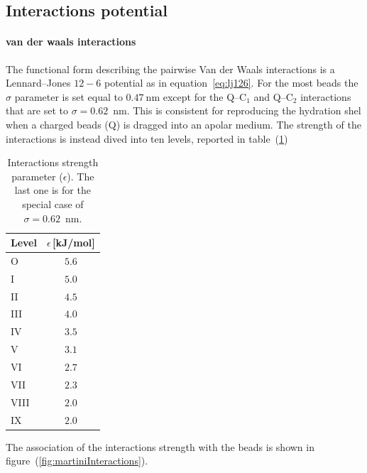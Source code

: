 \subsection{Interactions potential}
\paragraph{\textbf{van der waals interactions}} The functional form describing the pairwise Van der Waals interactions is a Lennard--Jones $12-6$ potential as in equation~\eqref{eq:lj126}.
For the most beads the $\sigma$ parameter is set equal to $0.47~$nm except for the Q--C$_1$ and Q--C$_2$ interactions that are set to $\sigma = 0.62$~nm. This is consistent for reproducing the hydration shel when a charged beads (Q) is dragged into an apolar medium. The strength of the interactions is instead dived into ten levels, reported in table~(\ref{tab:martiniEpsilon})
\begin{table}\footnotesize
\begin{tabular}{lc}
	\toprule
	Level  & $\epsilon$\,[kJ/mol] \\ \midrule
	O	   & $5.6$	 \\ \midrule
	I      & $5.0$	 \\ \midrule
	II	   & $4.5$	 \\ \midrule
	III	   & $4.0$	 \\ \midrule
	IV	   & $3.5$	 \\ \midrule
	V	   & $3.1$	 \\ \midrule
	VI	   & $2.7$	 \\ \midrule
	VII	   & $2.3$	 \\ \midrule
	VIII   & $2.0$	 \\ \midrule
	IX     & $2.0$	 \\ \bottomrule
\end{tabular}
\caption{Interactions strength parameter ($\epsilon$). The last one is for the special case of $\sigma=0.62$~nm.}
\label{tab:martiniEpsilon}
\end{table}
The association of the interactions strength with the \martini beads is shown in figure~(\ref{fig:martiniInteractions}).

